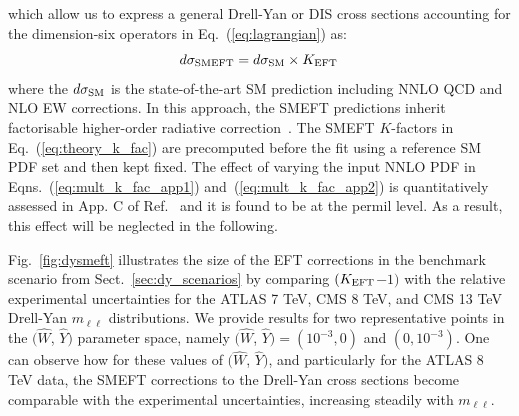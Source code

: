 \documentclass[withindex,glossary]{cam-thesis}
\begin{document}
  which allow us to express a general Drell-Yan or DIS cross sections accounting for
  the dimension-six operators in Eq.~(\ref{eq:lagrangian}) as:
\begin{equation}
  \label{eq:theory_k_fac_app3}
  d\sigma_{\rm SMEFT} = d\sigma_{\rm SM}
  \times  K_{\rm EFT} \, 
\end{equation}
where the $ d\sigma_{\rm SM}$ is the state-of-the-art SM prediction
including NNLO QCD and NLO EW corrections.
%
In this approach, the SMEFT predictions inherit factorisable higher-order radiative correction~\cite{Greljo:2017vvb,Ricci:2020xre}. 
%
%
The SMEFT $K$-factors in Eq.~(\ref{eq:theory_k_fac}) are
precomputed before the fit using a reference SM PDF set and then kept fixed.
%
The effect of varying the input NNLO PDF in
Eqns.~(\ref{eq:mult_k_fac_app1}) and~(\ref{eq:mult_k_fac_app2})
is quantitatively assessed in App. C of Ref.~\cite{Greljo:2021kvv} and it
is found to be at the permil level.
As a result, this effect will be neglected in the following.

Fig.~\ref{fig:dysmeft} illustrates the size of the EFT corrections in
the benchmark scenario from Sect.~\ref{sec:dy_scenarios} by comparing
$(K_{\rm EFT}$$-$$1)$
with the relative experimental
  uncertainties  for the ATLAS 7 TeV, CMS 8 TeV,
  and CMS 13 TeV Drell-Yan $m_{\ell\ell}$ distributions.
  We provide results for two representative points in the $(\hat{W}$, $\hat{Y})$
  parameter space, namely $(\hat{W}$, $\hat{Y})=(10^{-3},0)$ and $(0,10^{-3})$.
  One can observe how for these values of $(\hat{W}$, $\hat{Y})$, 
and particularly for the ATLAS 8 TeV data, the SMEFT corrections
  to the Drell-Yan cross sections become comparable with the experimental uncertainties, 
  increasing steadily with $m_{\ell\ell}$.
\end{document}
